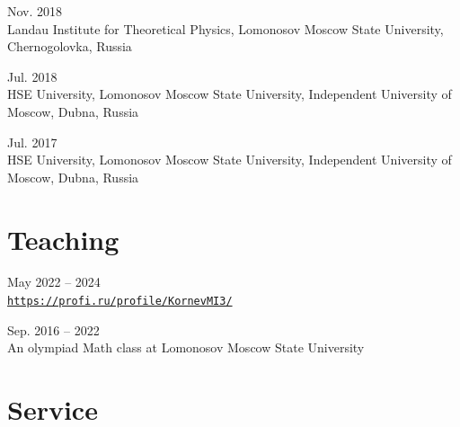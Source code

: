 \documentclass[11pt,letterpaper]{report}
\begin{document}
\begin{tablist}
        \item{Nov. 2018} \\ Landau Institute for Theoretical Physics, Lomonosov Moscow State University, Chernogolovka, Russia
       
       \item{Jul. 2018} \\ HSE University, Lomonosov Moscow State University, Independent University of Moscow, Dubna, Russia
       
        \item{Jul. 2017} \\ HSE University, Lomonosov Moscow State University, Independent University of Moscow, Dubna, Russia
        
            
    \end{tablist}

    
    
    
    
    \section*{Teaching}

    \begin{tablist}
    
       \item{May 2022 -- 2024} \\ \href{https://profi.ru/profile/KornevMI3/}{\tt https://profi.ru/profile/KornevMI3/} 

        \item{Sep. 2016 -- 2022} \\ An olympiad Math class at Lomonosov Moscow State University
        
    \end{tablist}
    
    
   




    \section*{Service}
\end{document}
